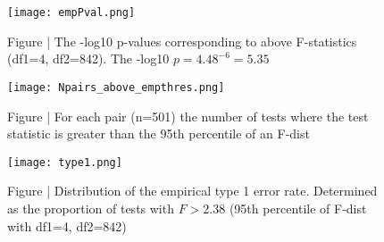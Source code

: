 \documentclass[paper=a4, fontsize=11pt]{scrartcl}         %
\numberwithin{equation}{section}                  %
\numberwithin{figure}{section}                    %
\numberwithin{table}{section}                   %
\begin{document}
\begin{figure}[H]
\centering
\texttt{[image: empPval.png]}
\caption*{Figure | The -log10 p-values corresponding to above F-statistics (df1=4, df2=842). The -log10 $p=4.48^{-6} = 5.35$}
\end{figure}



\newpage

\begin{figure}[H]
\centering
\texttt{[image: Npairs\_above\_empthres.png]}
\caption*{Figure | For each pair (n=501) the number of tests where the test statistic is greater than the 95th percentile of an F-dist}
\end{figure}


\begin{figure}[H]
\centering
\texttt{[image: type1.png]}
\caption*{Figure | Distribution of the empirical type 1 error rate. Determined as the proportion of tests with $F > 2.38$ (95th percentile of F-dist with df1=4, df2=842)}
\end{figure}



\newpage
\end{document}
